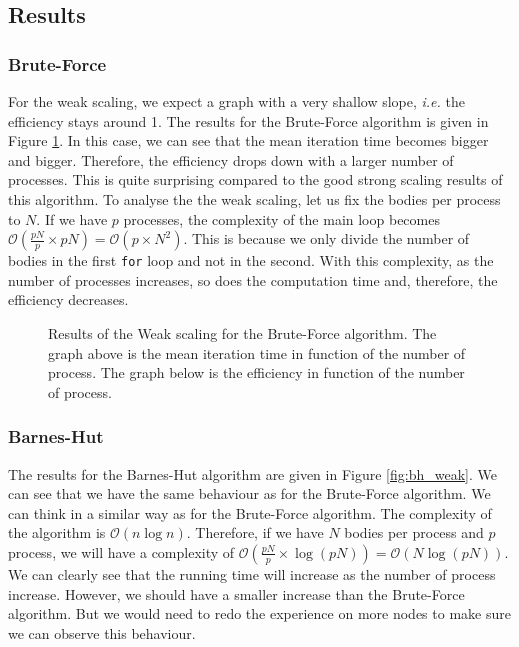 \documentclass[10pt,a4paper]{article}
\begin{document}
\subsection{Results}

\subsubsection{Brute-Force}

For the weak scaling, we expect a graph with a very shallow slope, {\it i.e.} the efficiency stays around 1. The results for the Brute-Force algorithm is given in Figure \ref{fig:bf_weak}. In this case, we can see that the mean iteration time becomes bigger and bigger. Therefore, the efficiency drops down with a larger number of processes. This is quite surprising compared to the good strong scaling results of this algorithm. To analyse the the weak scaling, let us fix the bodies per process to $N$. If we have $p$ processes, the complexity of the main loop becomes $\mathcal{O}(\frac{pN}{p}\times pN) = \mathcal{O}(p\times N^2)$. This is because we only divide the number of bodies in the first \verb+for+ loop and not in the second. With this complexity, as the number of processes increases, so does the computation time and, therefore, the efficiency decreases.
\begin{figure}[H]
\centering

\caption{\label{fig:bf_weak} Results of the Weak scaling for the Brute-Force algorithm. The graph above is the mean iteration time in function of the number of process. The graph below is the efficiency in function of the number of process.}
\end{figure}

\subsubsection{Barnes-Hut}

The results for the Barnes-Hut algorithm are given in Figure \ref{fig:bh_weak}. We can see that we have the same behaviour as for the Brute-Force algorithm. We can think in a similar way as for the Brute-Force algorithm. The complexity of the algorithm is $\mathcal{O}(n\log n)$. Therefore, if we have $N$ bodies per process and $p$ process, we will have a complexity of $\mathcal{O}(\frac{pN}{p}\times\log(pN)) = \mathcal{O}(N\log(pN))$. We can clearly see that the running time will increase as the number of process increase. However, we should have a smaller increase than the Brute-Force algorithm. But we would need to redo the experience on more nodes to make sure we can observe this behaviour.
\end{document}
